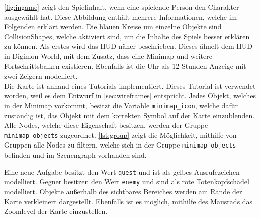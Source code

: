 \autoref{fig:ingame} zeigt den Spielinhalt, wenn eine spielende Person den Charakter ausgewählt hat. Diese Abbildung enthält mehrere Informationen, welche im Folgenden erklärt werden. Die blauen Kreise um einzelne Objekte sind CollisionShapes, welche aktiviert sind, um die Inhalte des Spiels besser erklären zu können. Als erstes wird das \ac{HUD} näher beschrieben. Dieses ähnelt dem \ac{HUD} in Digimon World, mit dem Zusatz, dass eine Minimap und weitere Fortschrittsbalken existieren. Ebenfalls ist die Uhr als 12-Stunden-Anzeige mit zwei Zeigern modelliert.\\

Die Karte ist anhand eines Tutorials implementiert\cite{kids-minimap}. Dieses Tutorial ist verwendet worden, weil es dem Entwurf in \autoref{sec:wireframes} entspricht. Jedes Objekt, welches in der Minimap vorkommt, besitzt die Variable \texttt{minimap\_icon}, welche dafür zuständig ist, das Objekt mit dem korrekten Symbol auf der Karte einzublenden. Alle Nodes, welche diese Eigenschaft besitzen, werden der Gruppe \texttt{minimap\_objects} zugeordnet. \autoref{lst:group} zeigt die Möglichkeit, mithilfe von Gruppen alle Nodes zu filtern, welche sich in der Gruppe \texttt{minimap\_objects} befinden und im Szenengraph vorhanden sind.\\


Eine neue Aufgabe besitzt den Wert \texttt{quest} und ist als gelbes Ausrufezeichen modelliert. Gegner besitzen den Wert \texttt{enemy} und sind als rote Totenkopfschädel modelliert. Objekte außerhalb des sichtbares Bereiches werden am Rande der Karte verkleinert dargestellt. Ebenfalls ist es möglich, mithilfe des Mausrads das Zoomlevel der Karte einzustellen. \\

